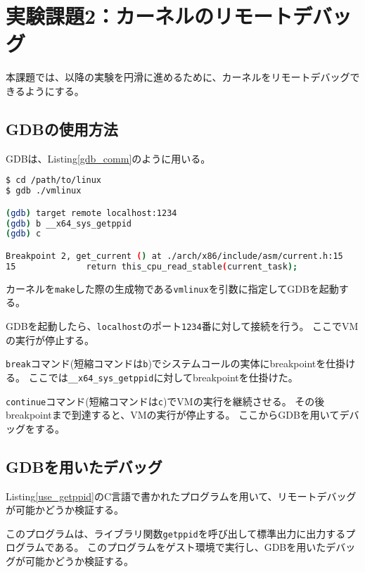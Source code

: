 \documentclass[main]{subfiles}
\begin{document}
\section{実験課題2：カーネルのリモートデバッグ}

本課題では、以降の実験を円滑に進めるために、カーネルをリモートデバッグできるようにする。

\subsection{GDBの使用方法}

GDBは、Listing\ref{gdb_comm}のように用いる。

\begin{lstlisting}[label=gdb_comm,caption=GDBの使用の様子,language=sh]
$ cd /path/to/linux
$ gdb ./vmlinux

(gdb) target remote localhost:1234
(gdb) b __x64_sys_getppid
(gdb) c

Breakpoint 2, get_current () at ./arch/x86/include/asm/current.h:15
15              return this_cpu_read_stable(current_task);
\end{lstlisting}

カーネルを\texttt{make}した際の生成物である\texttt{vmlinux}を引数に指定してGDBを起動する。

GDBを起動したら、\texttt{localhost}のポート\texttt{1234}番に対して接続を行う。
ここでVMの実行が停止する。

\texttt{break}コマンド(短縮コマンドは\texttt{b})でシステムコールの実体にbreakpointを仕掛ける。
ここでは\texttt{\_\_x64\_sys\_getppid}に対してbreakpointを仕掛けた。

\texttt{continue}コマンド(短縮コマンドは\texttt{c})でVMの実行を継続させる。
その後breakpointまで到達すると、VMの実行が停止する。
ここからGDBを用いてデバッグをする。

\subsection{GDBを用いたデバッグ}

Listing\ref{use_getppid}のC言語で書かれたプログラムを用いて、リモートデバッグが可能かどうか検証する。



このプログラムは、ライブラリ関数\texttt{getppid}を呼び出して標準出力に出力するプログラムである。
このプログラムをゲスト環境で実行し、GDBを用いたデバッグが可能かどうか検証する。
\end{document}
